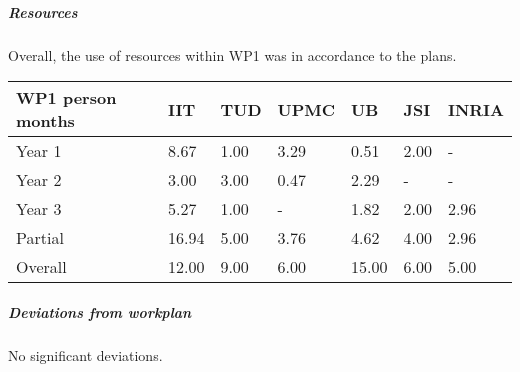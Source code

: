 

\subparagraph*{Resources}
Overall, the use of resources within WP1 was in accordance to the plans. 

\begin{center}
  \begin{tabular}{|C{1.5cm}|C{1.5cm}|C{1.5cm}|C{2cm}|C{2cm}|C{2cm}|C{2cm}|}
    \hline \footnotesize \textbf{WP1 person months}& \footnotesize
    \textbf{IIT}&\footnotesize \textbf{TUD}&\footnotesize \textbf{UPMC}&
    \footnotesize \textbf{UB} &\footnotesize \textbf{JSI} & \footnotesize \textbf{INRIA}\\
    \hline \footnotesize Year 1 & 8.67 &1.00 & 3.29 & 0.51 & 2.00 & -\\
    \hline \footnotesize Year 2 & 3.00 & 3.00 & 0.47 & 2.29 & - & - \\
    \hline \footnotesize Year 3 & 5.27 & 1.00 & - & 1.82 & 2.00 & 2.96 \\
	\hline \footnotesize Partial & 16.94 & 5.00 & 3.76 & 4.62 & 4.00 & 2.96 \\
	\hline
    \hline \footnotesize Overall & 12.00 & 9.00 & 6.00 & 15.00 & 6.00 & 5.00 \\
    \hline
  \end{tabular}
\end{center}

\subparagraph*{Deviations from workplan} 
No significant deviations. 
